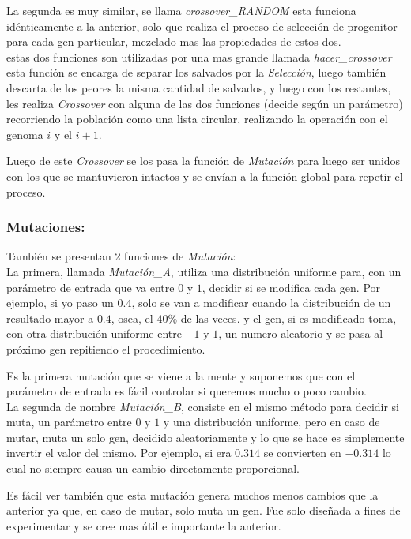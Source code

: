 La segunda es muy similar, se llama \emph{crossover\_RANDOM} esta funciona idénticamente a la anterior, solo que realiza el proceso
de selección de progenitor para cada gen particular, mezclado mas las propiedades de estos dos.\\

estas dos funciones son utilizadas por una mas grande llamada \emph{hacer\_crossover} esta función se encarga de separar los salvados
por la \emph{Selección}, luego también descarta de los peores la misma cantidad de salvados, y luego con los restantes, les realiza
\emph{Crossover} con alguna de las dos funciones (decide según un parámetro) recorriendo la población como una lista circular,
realizando la operación con el genoma $i$ y el $i+1$.

Luego de este \emph{Crossover} se los pasa la función de \emph{Mutación} para luego ser unidos con los que se mantuvieron
intactos y se envían a la función global para repetir el proceso.


\subsubsection{Mutaciones:}

También se presentan 2 funciones de \emph{Mutación}:\\

La primera, llamada \emph{Mutación\_A}, utiliza una distribución uniforme para, con un parámetro de entrada que va entre $0$ y $1$,
decidir si se modifica cada gen. Por ejemplo, si yo paso un $0.4$, solo se van a modificar cuando
la distribución de un resultado mayor a $0.4$, osea, el $40\%$ de las veces. y el gen, si es modificado toma,
con otra distribución uniforme entre $-1$ y $1$, un numero aleatorio y se pasa al próximo gen repitiendo
el procedimiento.


Es la primera mutación que se viene a la mente y suponemos que con el parámetro de entrada es fácil controlar si queremos
mucho o poco cambio.\\

La segunda de nombre \emph{Mutación\_B}, consiste en el mismo método para decidir si muta, un parámetro  entre $0$ y $1$
y una distribución uniforme, pero en caso de mutar, muta un solo gen, decidido aleatoriamente y lo que se hace es simplemente
invertir el valor del mismo. Por ejemplo, si era $0.314$ se convierten en $-0.314$ lo cual no siempre causa un cambio
directamente proporcional.

Es fácil ver también que esta mutación genera muchos menos cambios que la anterior ya que, en caso de mutar, solo muta un gen.
Fue solo diseñada a fines de experimentar y se cree mas útil e importante la anterior.

